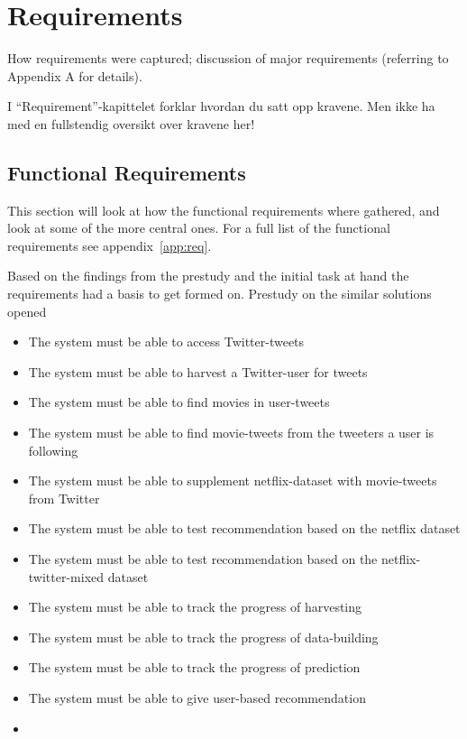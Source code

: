 
\chapter{Requirements}

\minitoc

How requirements  were  captured;
  discussion  of  major requirements
(referring  to  Appendix  A for details).

I “Requirement”-kapittelet forklar hvordan du satt opp kravene.
Men ikke ha med en fullstendig oversikt over kravene her!


\clearpage

\section{Functional Requirements}
This section will look at how the functional requirements where gathered, and look at some of the more central ones. For a full list of the functional requirements see appendix~\ref{app:req}.

Based on the findings from the prestudy and the initial task at hand the requirements had a basis to get formed on. Prestudy on the similar solutions opened

\begin{itemize}
  \item The system must be able to access Twitter-tweets
  \item The system must be able to harvest a Twitter-user for tweets
  \item The system must be able to find movies in user-tweets
  \item The system must be able to find movie-tweets from the tweeters a user is following

  \item The system must be able to supplement netflix-dataset with movie-tweets from Twitter
  \item The system must be able to test recommendation based on the netflix dataset
  \item The system must be able to test recommendation based on the netflix-twitter-mixed dataset
  \item The system must be able to track the progress of harvesting
  \item The system must be able to track the progress of data-building
  \item The system must be able to track the progress of prediction
  \item The system must be able to give user-based recommendation
  \item
\end{itemize}

